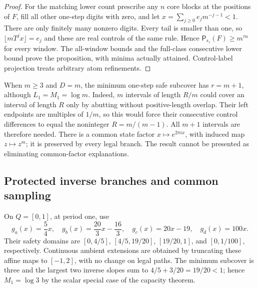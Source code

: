\documentclass[11pt,reqno]{amsart}
\numberwithin{equation}{section}
\theoremstyle{definition}
\theoremstyle{definition}
\newcommand{\Patt}{\mathsf P}
\begin{document}
\begin{proof}
For the matching lower count prescribe any $n$ core blocks at the
positions of $F$, fill all other one-step digits with zero, and let
$x=\sum_{j\ge0}e_jm^{-j-1}<1$. There are only finitely many
nonzero digits. Every tail is smaller than one, so
$\lfloor mT^jx\rfloor=e_j$ and these are real controls of the
same rule. Hence $\Patt_{s_\tau}(F)\ge m^{\tau n}$ for every
window. The all-window bounds and the full-class consecutive lower
bound prove the proposition, with minima actually attained.
Control-label projection treats arbitrary atom refinements.
\end{proof}

When $m\ge3$ and $D=m$, the minimum one-step safe subcover has
$r=m+1$, although $L_1=M_1=\log m$. Indeed, $m$ intervals of
length $R/m$ could cover an interval of length $R$ only by abutting
without positive-length overlap. Their left endpoints are multiples
of $1/m$, so this would force their consecutive control differences
to equal the noninteger $R=m/(m-1)$. All $m+1$ intervals are
therefore needed. There is a common state factor
$x\mapsto e^{2\pi ix}$, with induced map $z\mapsto z^m$;
it is preserved by every legal branch. The result cannot be presented
as eliminating common-factor explanations.

\subsection{Protected inverse branches and common sampling}
On $Q=[0,1]$, at period one, use
\[
 g_a(x)=\frac54x,\quad g_b(x)=\frac{20}3x-\frac{16}3,
 \quad g_c(x)=20x-19,\quad g_d(x)=100x.
\]
Their safety domains are
$[0,4/5]$, $[4/5,19/20]$, $[19/20,1]$, and
$[0,1/100]$, respectively. Continuous ambient extensions are
obtained by truncating these affine maps to $[-1,2]$, with no
change on legal paths. The minimum subcover is three and the largest
two inverse slopes sum to $4/5+3/20=19/20<1$; hence
$M_1=\log3$ by the scalar special case of the capacity theorem.
\end{document}
